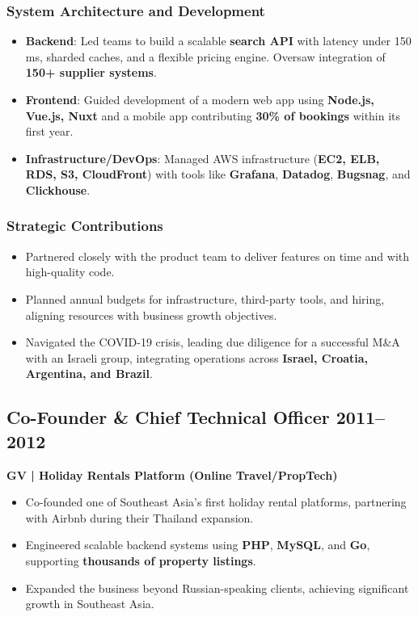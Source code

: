 \documentclass[11pt,a4paper]{article}
\begin{document}
\subsubsection*{System Architecture and Development}
\begin{itemize}
    \item \textbf{Backend}: Led teams to build a scalable \textbf{search API} with latency under 150 ms, sharded caches, and a flexible pricing engine. Oversaw integration of \textbf{150+ supplier systems}.
    \item \textbf{Frontend}: Guided development of a modern web app using \textbf{Node.js, Vue.js, Nuxt} and a mobile app contributing \textbf{30\% of bookings} within its first year.
    \item \textbf{Infrastructure/DevOps}: Managed AWS infrastructure (\textbf{EC2, ELB, RDS, S3, CloudFront}) with tools like \textbf{Grafana}, \textbf{Datadog}, \textbf{Bugsnag}, and \textbf{Clickhouse}.
\end{itemize}

\subsubsection*{Strategic Contributions}
\begin{itemize}
    \item Partnered closely with the product team to deliver features on time and with high-quality code.
    \item Planned annual budgets for infrastructure, third-party tools, and hiring, aligning resources with business growth objectives.
    \item Navigated the COVID-19 crisis, leading due diligence for a successful M\&A with an Israeli group, integrating operations across \textbf{Israel, Croatia, Argentina, and Brazil}.
\end{itemize}

\subsection*{Co-Founder \& Chief Technical Officer \hfill 2011--2012}
\textbf{GV | Holiday Rentals Platform (Online Travel/PropTech)}
\begin{itemize}
    \item Co-founded one of Southeast Asia's first holiday rental platforms, partnering with Airbnb during their Thailand expansion.
    \item Engineered scalable backend systems using \textbf{PHP}, \textbf{MySQL}, and \textbf{Go}, supporting \textbf{thousands of property listings}.
    \item Expanded the business beyond Russian-speaking clients, achieving significant growth in Southeast Asia.
\end{itemize}
\end{document}
